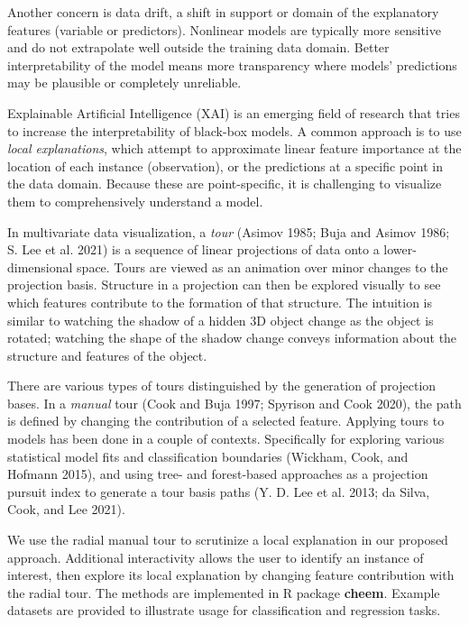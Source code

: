 \documentclass[
]{article}
\begin{document}
Another concern is data drift, a shift in support or domain of the explanatory features (variable or predictors). Nonlinear models are typically more sensitive and do not extrapolate well outside the training data domain. Better interpretability of the model means more transparency where models' predictions may be plausible or completely unreliable.

Explainable Artificial Intelligence (XAI) is an emerging field of research that tries to increase the interpretability of black-box models. A common approach is to use \emph{local explanations}, which attempt to approximate linear feature importance at the location of each instance (observation), or the predictions at a specific point in the data domain. Because these are point-specific, it is challenging to visualize them to comprehensively understand a model.

In multivariate data visualization, a \emph{tour} (Asimov 1985; Buja and Asimov 1986; S. Lee et al. 2021) is a sequence of linear projections of data onto a lower-dimensional space. Tours are viewed as an animation over minor changes to the projection basis. Structure in a projection can then be explored visually to see which features contribute to the formation of that structure. The intuition is similar to watching the shadow of a hidden 3D object change as the object is rotated; watching the shape of the shadow change conveys information about the structure and features of the object.

There are various types of tours distinguished by the generation of projection bases. In a \emph{manual} tour (Cook and Buja 1997; Spyrison and Cook 2020), the path is defined by changing the contribution of a selected feature. Applying tours to models has been done in a couple of contexts. Specifically for exploring various statistical model fits and classification boundaries (Wickham, Cook, and Hofmann 2015), and using tree- and forest-based approaches as a projection pursuit index to generate a tour basis paths (Y. D. Lee et al. 2013; da Silva, Cook, and Lee 2021).

We use the radial manual tour to scrutinize a local explanation in our proposed approach. Additional interactivity allows the user to identify an instance of interest, then explore its local explanation by changing feature contribution with the radial tour. The methods are implemented in R package \textbf{cheem}. Example datasets are provided to illustrate usage for classification and regression tasks.
\end{document}
